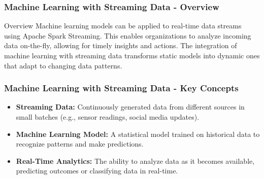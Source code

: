 \documentclass[aspectratio=169]{beamer}
\begin{document}
\begin{frame}[fragile]
    \frametitle{Machine Learning with Streaming Data - Overview}
    \begin{block}{Overview}
        Machine learning models can be applied to real-time data streams using Apache Spark Streaming. 
        This enables organizations to analyze incoming data on-the-fly, allowing for timely insights and actions. 
        The integration of machine learning with streaming data transforms static models into dynamic ones that adapt to changing data patterns.
    \end{block}
\end{frame}

\begin{frame}[fragile]
    \frametitle{Machine Learning with Streaming Data - Key Concepts}
    \begin{itemize}
        \item \textbf{Streaming Data:} Continuously generated data from different sources in small batches (e.g., sensor readings, social media updates).
        \item \textbf{Machine Learning Model:} A statistical model trained on historical data to recognize patterns and make predictions.
        \item \textbf{Real-Time Analytics:} The ability to analyze data as it becomes available, predicting outcomes or classifying data in real-time.
    \end{itemize}
\end{frame}
\end{document}
